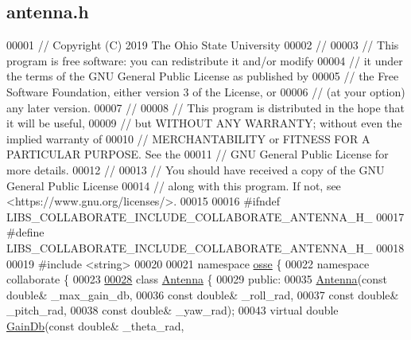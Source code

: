 \hypertarget{antenna_8h_source}{}\subsection{antenna.\+h}
\label{antenna_8h_source}

\begin{DoxyCode}
00001 \textcolor{comment}{// Copyright (C) 2019 The Ohio State University}
00002 \textcolor{comment}{//}
00003 \textcolor{comment}{// This program is free software: you can redistribute it and/or modify}
00004 \textcolor{comment}{// it under the terms of the GNU General Public License as published by}
00005 \textcolor{comment}{// the Free Software Foundation, either version 3 of the License, or}
00006 \textcolor{comment}{// (at your option) any later version.}
00007 \textcolor{comment}{//}
00008 \textcolor{comment}{// This program is distributed in the hope that it will be useful,}
00009 \textcolor{comment}{// but WITHOUT ANY WARRANTY; without even the implied warranty of}
00010 \textcolor{comment}{// MERCHANTABILITY or FITNESS FOR A PARTICULAR PURPOSE.  See the}
00011 \textcolor{comment}{// GNU General Public License for more details.}
00012 \textcolor{comment}{//}
00013 \textcolor{comment}{// You should have received a copy of the GNU General Public License}
00014 \textcolor{comment}{// along with this program.  If not, see <https://www.gnu.org/licenses/>.}
00015 
00016 \textcolor{preprocessor}{#ifndef LIBS\_COLLABORATE\_INCLUDE\_COLLABORATE\_ANTENNA\_H\_}
00017 \textcolor{preprocessor}{#define LIBS\_COLLABORATE\_INCLUDE\_COLLABORATE\_ANTENNA\_H\_}
00018 
00019 \textcolor{preprocessor}{#include <string>}
00020 
00021 \textcolor{keyword}{namespace }\hyperlink{namespaceosse}{osse} \{
00022 \textcolor{keyword}{namespace }collaborate \{
00023 
\hyperlink{classosse_1_1collaborate_1_1_antenna}{00028} \textcolor{keyword}{class }\hyperlink{classosse_1_1collaborate_1_1_antenna}{Antenna} \{
00029  \textcolor{keyword}{public}:
00035   \hyperlink{classosse_1_1collaborate_1_1_antenna_a0f871800c6102bc92a2bda159f43b240}{Antenna}(\textcolor{keyword}{const} \textcolor{keywordtype}{double}& \_max\_gain\_db,
00036           \textcolor{keyword}{const} \textcolor{keywordtype}{double}& \_roll\_rad,
00037           \textcolor{keyword}{const} \textcolor{keywordtype}{double}& \_pitch\_rad,
00038           \textcolor{keyword}{const} \textcolor{keywordtype}{double}& \_yaw\_rad);
00043   \textcolor{keyword}{virtual} \textcolor{keywordtype}{double} \hyperlink{classosse_1_1collaborate_1_1_antenna_a67214b4b28f3d48931c8fb435cc1f85d}{GainDb}(\textcolor{keyword}{const} \textcolor{keywordtype}{double}& \_theta\_rad,

\end{DoxyCode}
